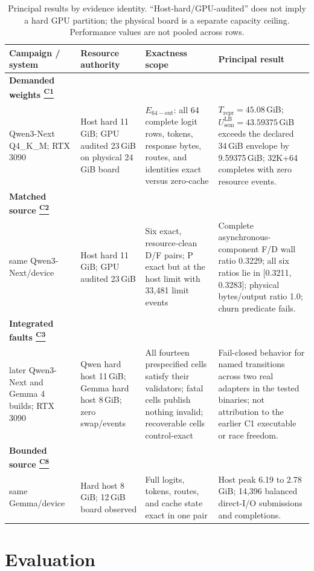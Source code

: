 \documentclass[letterpaper,twocolumn,10pt]{article}
\newcommand{\GiB}{\,GiB\xspace}
\newcommand{\claimref}[1]{\hyperlink{claim:#1}{\textsuperscript{\textsf{#1}}}}
\begin{document}
\begin{table}[t]
  \centering
  \scriptsize
  \caption{Principal results by evidence identity.  ``Host-hard/GPU-audited''
  does not imply a hard GPU partition; the physical board is a separate
  capacity ceiling.  Performance values are not pooled across rows.}
  \label{tab:summary}
  \begin{tabularx}{\textwidth}{@{}p{2.45cm}p{2.55cm}p{3.55cm}X@{}}
    \toprule
    Campaign / system & Resource authority & Exactness scope & Principal result \\
    \midrule
    \textbf{Demanded weights \claimref{C1}}\\Qwen3-Next Q4\_K\_M; RTX 3090 & Host hard 11\GiB; GPU audited 23\GiB on physical 24\GiB board & $E_{\mathrm{64-out}}$: all 64 complete logit rows, tokens, response bytes, routes, and identities exact versus zero-cache & $T_{\mathrm{repr}}=45.08$\GiB; $U_{\mathrm{sem}}^{\mathrm{LB}}=43.59375$\GiB exceeds the declared 34\GiB envelope by 9.59375\GiB; 32K+64 completes with zero resource events. \\
    \textbf{Matched source \claimref{C2}}\\same Qwen3-Next/device & Host hard 11\GiB; GPU audited 23\GiB & Six exact, resource-clean D/F pairs; P exact but at the host limit with 33,481 limit events & Complete asynchronous-component F/D wall ratio 0.3229; all six ratios lie in [0.3211, 0.3283]; physical bytes/output ratio 1.0; churn predicate fails. \\
    \textbf{Integrated faults \claimref{C3}}\\later Qwen3-Next and Gemma 4 builds; RTX 3090 & Qwen hard host 11\GiB; Gemma hard host 8\GiB; zero swap/events & All fourteen prespecified cells satisfy their validators; fatal cells publish nothing invalid; recoverable cells control-exact & Fail-closed behavior for named transitions across two real adapters in the tested binaries; not attribution to the earlier C1 executable or race freedom. \\
    \textbf{Bounded source \claimref{C8}}\\same Gemma/device & Hard host 8\GiB; 12\GiB board observed & Full logits, tokens, routes, and cache state exact in one pair & Host peak 6.19 to 2.78\GiB; 14,396 balanced direct-I/O submissions and completions. \\
    \bottomrule
  \end{tabularx}
\end{table}

\section{Evaluation}
\label{sec:evaluation}
\end{document}
